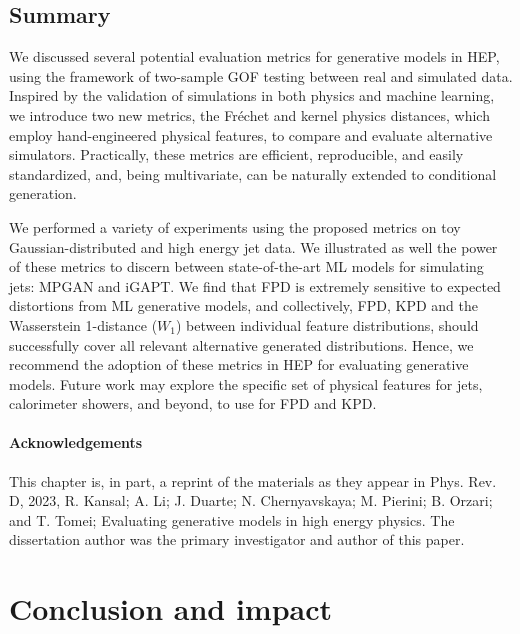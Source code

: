 \section{Summary}
\label{sec:04_evaluating_conclusion} 

We discussed several potential evaluation metrics for generative models in HEP, using the framework of two-sample GOF testing between real and simulated data.
Inspired by the validation of simulations in both physics and machine learning, we introduce two new metrics, the Fr\'echet and kernel physics distances, which employ hand-engineered physical features, to compare and evaluate alternative simulators.
Practically, these metrics are efficient, reproducible, and easily standardized, and, being multivariate, can be naturally extended to conditional generation.

We performed a variety of experiments using the proposed metrics on toy Gaussian-distributed and high energy jet data.
We illustrated as well the power of these metrics to discern between state-of-the-art ML models for simulating jets: MPGAN and iGAPT.
We find that FPD is extremely sensitive to expected distortions from ML generative models, and collectively, FPD, KPD and the Wasserstein 1-distance ($W_1$) between individual feature distributions, should successfully cover all relevant alternative generated distributions.
Hence, we recommend the adoption of these metrics in HEP for evaluating generative models. 
Future work may explore the specific set of physical features for jets, calorimeter showers, and beyond, to use for FPD and KPD.

\subsubsection{Acknowledgements}

This chapter is, in part, a reprint of the materials as they appear in
Phys. Rev. D, 2023, R. Kansal; A. Li; J. Duarte; N. Chernyavskaya; M. Pierini; B. Orzari; and T. Tomei; Evaluating generative models in high energy physics.
The dissertation author was the primary investigator and author of this paper.

\chapter{Conclusion and impact}
\label{sec:04_outlook}

